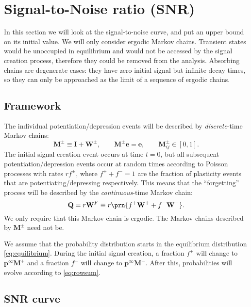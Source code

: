 \documentclass[12pt]{article}
\newcommand{\I}{\mathbf{I}}
\newcommand{\onev}{\mathbf{e}}
\newcommand{\MM}{\mathbf{Q}}
\newcommand{\eq}{\mathbf{p}^\infty}
\newcommand{\W}{\mathbf{W}}
\newcommand{\M}{\mathbf{M}}
\begin{document}
\section{Signal-to-Noise ratio (SNR)}\label{sec:SNR}

In this section we will look at the signal-to-noise curve, and put an upper bound on its initial value.
We will only consider ergodic Markov chains.
Transient states would be unoccupied in equilibrium and would not be accessed by the signal creation process, therefore they could be removed from the analysis.
Absorbing chains are degenerate cases: they have zero initial signal but infinite decay times, so they can only be approached as the limit of a sequence of ergodic chains.

\subsection{Framework}\label{sec:framework}

The individual potentiation/depression events will be described by \emph{discrete}-time Markov chains:
%
\begin{equation}\label{eq:MWdef}
  \M^\pm \equiv \I + \W^\pm,
  \qquad
  \M^\pm\onev = \onev,
  \qquad
  \M^\pm_{ij} \in [0,1].
\end{equation}
%
The initial signal creation event occurs at time $t=0$, but all subsequent potentiation/depression events occur at random times according to Poisson processes with rates $rf^\pm$, where $f^++f^-=1$ are the fraction of plasticity events that are potentiating/depressing respectively.
This means that the ``forgetting'' process will be described by the \emph{continuous}-time Markov chain:
%
\begin{equation}\label{eq:forgetting}
  \MM = r \W^F \equiv r\prn{f^+\W^+ + f^-\W^-}.
\end{equation}
%
We only require that this Markov chain is ergodic. The Markov chains described by $\M^\pm$ need not be.


We assume that the probability distribution starts in the equilibrium distribution \eqref{eq:equilibrium}.
During the initial signal creation, a fraction $f^+$ will change to $\eq\M^+$ and a fraction $f^-$ will change to $\eq\M^-$.
After this, probabilities will evolve according to \eqref{eq:rowsum}.

\subsection{SNR curve}\label{sec:SNRcurve}
\end{document}
